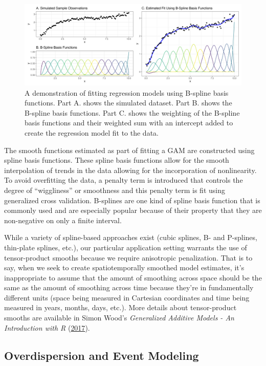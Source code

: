 \documentclass[
]{article}
\begin{document}
\begin{figure}
\includegraphics[width=1\linewidth]{figures/gam_demo_figure} \caption{A demonstration of fitting regression models using B-spline basis functions. Part A. shows the simulated dataset. Part B. shows the B-spline basis functions. Part C. shows the weighting of the B-spline basis functions and their weighted sum with an intercept added to create the regression model fit to the data.}\label{fig:gam-demo-figure}
\end{figure}

The smooth functions estimated as part of fitting a GAM are constructed using
spline basis functions. These spline basis functions allow for the smooth
interpolation of trends in the data allowing for the incorporation of
nonlinearity. To avoid overfitting the data, a penalty term is introduced that
controls the degree of ``wiggliness'' or smoothness and this penalty term is fit
using generalized cross validation. B-splines are one kind of spline basis function
that is commonly used and are especially popular because of their property that they
are non-negative on only a finite interval.

While a variety of spline-based approaches exist (cubic splines, B- and
P-splines, thin-plate splines, etc.), our particular application setting
warrants the use of tensor-product smooths because we require anisotropic
penalization. That is to say, when we seek to create spatiotemporally smoothed
model estimates, it's inappropriate to assume that the amount of smoothing
across space should be the same as the amount of smoothing across time because
they're in fundamentally different units (space being measured in Cartesian
coordinates and time being measured in years, months, days, etc.). More details
about tensor-product smooths are available in Simon Wood's \emph{Generalized Additive Models - An Introduction with R} (\protect\hyperlink{ref-wood_generalized_2017}{2017}).

\hypertarget{overdispersion-and-event-modeling}{%
\subsection{Overdispersion and Event Modeling}\label{overdispersion-and-event-modeling}}
\end{document}
